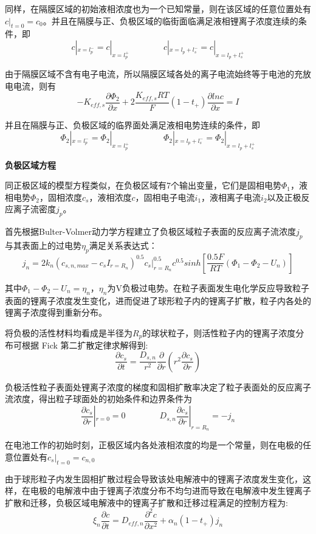 \documentclass[12pt]{ctexart}%
\begin{document}
同样，在隔膜区域的初始液相浓度也为一个已知常量，则在该区域的任意位置处有$c|_{t=0} = c_0$。并且在隔膜与正、负极区域的临街面临满足液相锂离子浓度连续的条件，即
$$c|_{x=l_p^-}  = c|_{x=l_p^+} \qquad \qquad c|_{x=l_p+l_s^-}  = c|_{x=l_p+l_s^+}$$

由于隔膜区域不含有电子电流，所以隔膜区域各处的离子电流始终等于电池的充放电电流，则有
$$ -K_{eff,s}\frac{\partial \Phi_2}{\partial x} + 2\frac{K_{eff,s}RT}{F}(1-t_+)\frac{\partial lnc}{\partial x} = I$$

并且在隔膜与正、负极区域的临界面处满足液相电势连续的条件，即
$$\Phi_2|_{x=l_p^-}  = \Phi_2|_{x=l_p^+} \qquad \qquad \Phi_2|_{x=l_p+l_s^-}  = \Phi_2|_{x=l_p+l_s^+}$$

\noindent\textbf{负极区域方程}

同正极区域的模型方程类似，在负极区域有7个输出变量，它们是固相电势$\Phi_1$，液相电势$\Phi_2$，固相浓度$c_s$，液相浓度$c$，固相电子电流$i_1$，液相离子电流$i_2$以及正极反应离子流密度$j_p$\cite{Diwakar2009TowardsEM}。

首先根据Bulter-Volmer动力学方程建立了负极区域粒子表面的反应离子流浓度$j_p$与其表面上的过电势$\eta_{p}$满足关系表达式：
$$j_n = 2k_n(c_{s,n,max} - c_sI_{r=R_n})^{0.5}c_s|^{0.5}_{r=R_n}c^{0.5}sinh[\frac{0.5F}{RT}(\Phi_1-\Phi_2-U_n)]$$

其中$\Phi_1-\Phi_2-U_n = \eta_{n}$，$\eta_{n}$为V负极过电势。在粒子表面发生电化学反应导致粒子表面的锂离子浓度发生变化，进而促进了球形粒子内的锂离子扩散，粒子内各处的锂离子浓度得到重新分布。

将负极的活性材料均看成是半径为$R_p$的球状粒子，则活性粒子内的锂离子浓度分布可根据 Fick 第二扩散定律求解得到:
$$\frac{\partial c_s}{\partial t} = \frac{D_{s,n}}{r^2}\frac{\partial}{\partial r}(r^2\frac{\partial c_s}{\partial r})$$

负极活性粒子表面处锂离子浓度的梯度和固相扩散率决定了粒子表面处的反应离子流浓度，得出粒子球面处的初始条件和边界条件为
$$\frac{\partial c_s}{\partial r}|_{r=0} = 0 \qquad \qquad D_{s,n}\frac{\partial c_s}{\partial r}|_{r=R_n} = -j_n$$

在电池工作的初始时刻，正极区域内各处液相浓度的均是一个常量，则在电极的任意位置处有$c_s|_{t=0} = c_{n,0}$

由于球形粒子内发生固相扩散过程会导致该处电解液中的锂离子浓度发生变化，这样，在电极的电解液中由于锂离子浓度分布不均匀进而导致在电解液中发生锂离子扩散和迁移，负极区域电解液中的锂离子扩散和迁移过程满足的控制方程\cite{Diwakar2009TowardsEM}为:
$$\xi_n\frac{\partial c}{\partial t}=D_{eff,n}\frac{\partial^2 c}{\partial x^2}+\alpha_n(1-t_+)j_n$$
\end{document}
